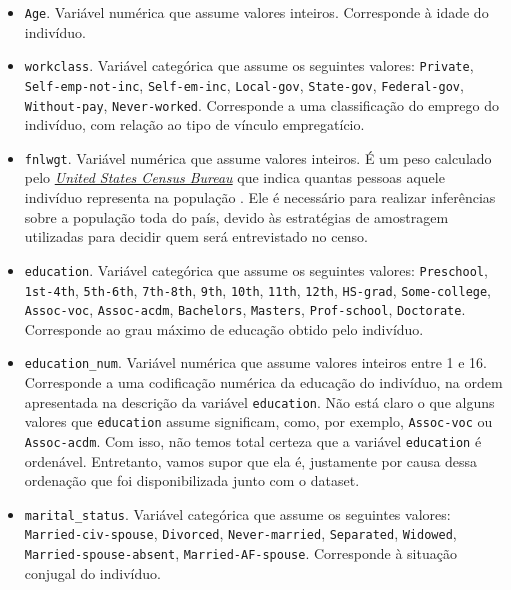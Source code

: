 \documentclass[a4paper, 12pt]{article}
\begin{document}
\begin{itemize}
    \item \verb|Age|.
        Variável numérica que assume valores inteiros.
        Corresponde à idade do indivíduo.

    \item \verb|workclass|.
        Variável categórica que assume os seguintes valores:
        \verb|Private|, \verb|Self-emp-not-inc|, \verb|Self-em-inc|, \verb|Local-gov|, \verb|State-gov|, \verb|Federal-gov|, \verb|Without-pay|, \verb|Never-worked|.
        Corresponde a uma classificação do emprego do indivíduo, com relação ao tipo de vínculo empregatício.

    \item \verb|fnlwgt|.
        Variável numérica que assume valores inteiros.
        É um peso calculado pelo \href{https://www.census.gov/programs-surveys/cps/technical-documentation/methodology/weighting.html}{\emph{United States Census Bureau}} que indica quantas pessoas aquele indivíduo representa na população .
        Ele é necessário para realizar inferências sobre a população toda do país, devido às estratégias de amostragem utilizadas para decidir quem será entrevistado no censo.

    \item \verb|education|.
        Variável categórica que assume os seguintes valores:
        \verb|Preschool|, \verb|1st-4th|, \verb|5th-6th|, \verb|7th-8th|, \verb|9th|, \verb|10th|, \verb|11th|, \verb|12th|, \verb|HS-grad|, \verb|Some-college|, \verb|Assoc-voc|, \verb|Assoc-acdm|, \verb|Bachelors|, \verb|Masters|, \verb|Prof-school|, \verb|Doctorate|.
        Corresponde ao grau máximo de educação obtido pelo indivíduo.

    \item \verb|education_num|.
        Variável numérica que assume valores inteiros entre 1 e 16.
        Corresponde a uma codificação numérica da educação do indivíduo, na ordem apresentada na descrição da variável \verb|education|.
        Não está claro o que alguns valores que \verb|education| assume significam, como, por exemplo, \verb|Assoc-voc| ou \verb|Assoc-acdm|.
        Com isso, não temos total certeza que a variável \verb|education| é ordenável.
        Entretanto, vamos supor que ela é, justamente por causa dessa ordenação que foi disponibilizada junto com o dataset.

    \item \verb|marital_status|.
        Variável categórica que assume os seguintes valores:
        \verb|Married-civ-spouse|, \verb|Divorced|, \verb|Never-married|, \verb|Separated|, \verb|Widowed|, \verb|Married-spouse-absent|, \verb|Married-AF-spouse|.
        Corresponde à situação conjugal do indivíduo.


\end{itemize}
\end{document}

